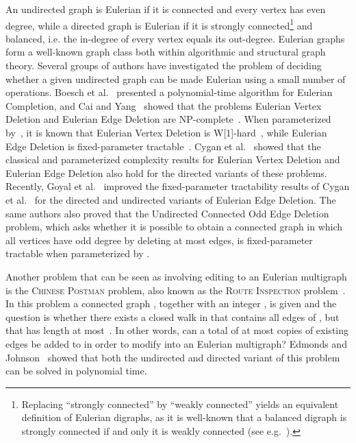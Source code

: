 \documentclass[11pt]{llncs}
\newcommand{\NP}{{\sf NP}}
\newcommand{\W}{{\sf W[1]}}
\begin{document}
An undirected graph is Eulerian if it is connected and every vertex has even
degree,
while 
a directed graph is Eulerian if it is strongly
connected\footnote{Replacing ``strongly connected'' by ``weakly connected''
yields an equivalent definition of Eulerian digraphs, as it is well-known that
a balanced digraph is strongly connected if and only it is weakly connected
(see e.g.~\cite{CyganMPPS14}).} and balanced, i.e. the in-degree of every
vertex equals its out-degree. Eulerian graphs form a well-known graph class
both within algorithmic and structural graph theory. 
Several groups of authors have investigated the problem of deciding 
whether
a given undirected graph can be made Eulerian using a small number of operations. Boesch et
al.~\cite{BoeschST77} presented a polynomial-time algorithm for {\sc Eulerian
Completion}, and 
Cai and Yang~\cite{CaiY11} showed that the problems {\sc
Eulerian Vertex Deletion} and {\sc Eulerian Edge Deletion} are
\NP-complete~\cite{CaiY11}. When parameterized by~, 
it is known that
{\sc Eulerian Vertex Deletion} is \W-hard~\cite{CaiY11}, while {\sc
Eulerian Edge Deletion} is fixed-parameter tractable~\cite{CyganMPPS14}. Cygan
et al.~\cite{CyganMPPS14} showed that the classical and parameterized
complexity results for {\sc Eulerian Vertex Deletion} and {\sc Eulerian Edge
Deletion} also hold for the directed variants of these problems.
Recently, Goyal et al.~\cite{GoyalMPPS14} improved the fixed-parameter tractability  results of Cygan et al.~\cite{CyganMPPS14} for the directed and undirected variants 
of {\sc Eulerian Edge
Deletion}. The same authors also proved that the {\sc Undirected Connected Odd Edge Deletion} problem, which asks whether it is possible to obtain a connected graph in which all vertices have odd degree by deleting at most  edges, is fixed-parameter tractable when parameterized by .

Another problem that can be seen as involving editing to an Eulerian multigraph
is the \textsc{Chinese Postman} problem, also known as the \textsc{Route
Inspection} problem~\cite{Kwan62}. In this problem a connected graph ,
together with an integer , is given and the question is whether there exists
a closed walk in  that contains all edges of , but that has length at
most~. In other words, can a total of at most  copies of existing edges
be added to  in order to modify  into an Eulerian multigraph? Edmonds and
Johnson~\cite{EdmondsJ73} showed that both the undirected and directed variant
of this problem can be solved in polynomial time.
\end{document}
